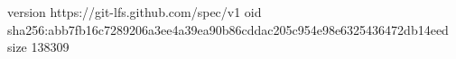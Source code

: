 version https://git-lfs.github.com/spec/v1
oid sha256:abb7fb16c7289206a3ee4a39ea90b86cddac205c954e98e6325436472db14eed
size 138309
